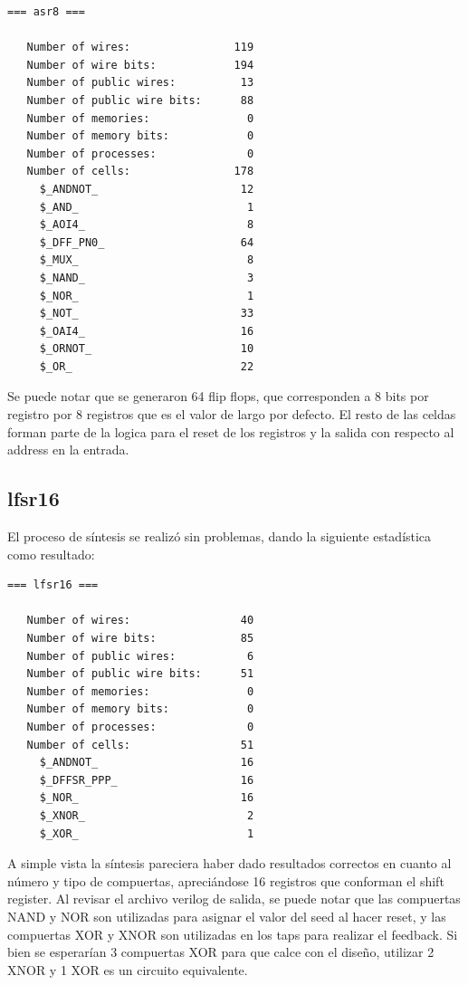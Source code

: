 \documentclass[letterpaper, 12pt]{article}
\numberwithin{equation}{section}
\begin{document}
\begin{verbatim}
=== asr8 ===

   Number of wires:                119
   Number of wire bits:            194
   Number of public wires:          13
   Number of public wire bits:      88
   Number of memories:               0
   Number of memory bits:            0
   Number of processes:              0
   Number of cells:                178
     $_ANDNOT_                      12
     $_AND_                          1
     $_AOI4_                         8
     $_DFF_PN0_                     64
     $_MUX_                          8
     $_NAND_                         3
     $_NOR_                          1
     $_NOT_                         33
     $_OAI4_                        16
     $_ORNOT_                       10
     $_OR_                          22
\end{verbatim}

Se puede notar que se generaron 64 flip flops, que corresponden a 8 bits por registro por 8 registros que es el valor de largo por defecto. El resto de las celdas forman parte de la logica para el reset de los registros y la salida con respecto al address en la entrada.

\subsection{lfsr16}

El proceso de síntesis se realizó sin problemas, dando la siguiente estadística como resultado:

\begin{verbatim}
=== lfsr16 ===

   Number of wires:                 40
   Number of wire bits:             85
   Number of public wires:           6
   Number of public wire bits:      51
   Number of memories:               0
   Number of memory bits:            0
   Number of processes:              0
   Number of cells:                 51
     $_ANDNOT_                      16
     $_DFFSR_PPP_                   16
     $_NOR_                         16
     $_XNOR_                         2
     $_XOR_                          1
\end{verbatim}

A simple vista la síntesis pareciera haber dado resultados correctos en cuanto al número y tipo de compuertas, apreciándose 16 registros que conforman el shift register. Al revisar el archivo verilog de salida, se puede notar que las compuertas NAND y NOR son utilizadas para asignar el valor del seed al hacer reset, y las compuertas XOR y XNOR son utilizadas en los taps para realizar el feedback. Si bien se esperarían 3 compuertas XOR para que calce con el diseño, utilizar 2 XNOR y 1 XOR es un circuito equivalente.
\end{document}
